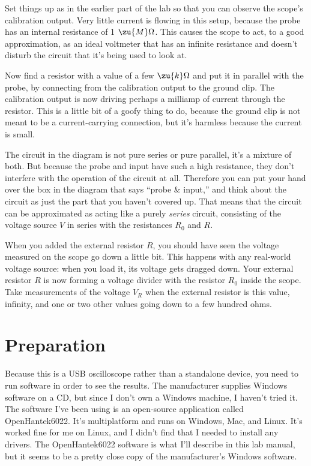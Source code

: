 Set things up as in the earlier part of the lab so that you can observe the
scope's calibration output. Very little current is flowing in this setup, because
the probe has an internal resistance of 1 $\zu{M}\Omega$. This causes the scope to act,
to a good approximation, as an ideal voltmeter that has an infinite resistance and
doesn't disturb the circuit that it's being used to look at.

Now find a resistor with a value of a few $\zu{k}\Omega$ and put it in parallel with
the probe, by connecting from the calibration output to the ground clip. The calibration
output is now driving perhaps a milliamp of current through the resistor. This is a little
bit of a goofy thing to do, because the ground clip is not meant to be a current-carrying
connection, but it's harmless because the current is small.


The circuit in the diagram is not pure series or pure parallel, it's a mixture of both.
But because the probe and input have such a high resistance, they don't interfere with
the operation of the circuit at all. Therefore you can put your hand over the box in
the diagram that says ``probe \& input,'' and think about the circuit as just the
part that you haven't covered up. That means that the circuit can be approximated as acting like a purely
\emph{series} circuit, consisting of the voltage source $V$ in series with the resistances
$R_0$ and $R$.

When you added the external resistor $R$, you should have seen the voltage measured on the scope go
down a little bit. This happens with any real-world voltage source: when you load it,
its voltage gets dragged down. Your external resistor $R$ is now forming a voltage divider
with the resistor $R_0$ inside the scope. Take measurements of the voltage $V_R$ when the external
resistor is this value, infinity, and one or two other values going down to a few hundred
ohms.

\section*{Preparation}

Because this is a USB oscilloscope rather than a standalone device,
you need to run software in order to see the results. The manufacturer
supplies Windows software on a CD, but since I don't own a Windows machine,
I haven't tried it. The software I've been using is an open-source application
called OpenHantek6022.
It's multiplatform and runs on Windows, Mac, and Linux. It's worked fine for me
on Linux, and I didn't find that I needed to install any drivers. The OpenHantek6022
software is what I'll describe in this lab manual, but it seems to be a pretty close
copy of the manufacturer's Windows software.

